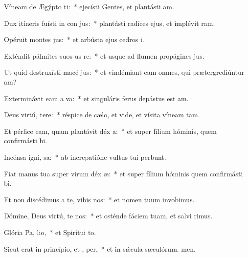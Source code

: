 \item Víneam de Ægýpto ti:~* ejecísti Gentes, et plantásti am.
\item Dux itíneris fuísti in con jus:~* plantásti radíces ejus, et implévit ram.
\item Opéruit montes  jus:~* et arbústa ejus cedros i.
\item Exténdit pálmites suos us  re:~* et usque ad flumen propágines jus.
\item Ut quid destruxísti macé jus:~* et vindémiant eam omnes, qui prætergrediúntur am?
\item Exterminávit eam a  va:~* et singuláris ferus depástus est am.
\item Deus virtú, tere:~* réspice de cælo, et vide, et vísita víneam tam.
\item Et pérfice eam, quam plantávit déx a:~* et super fílium hóminis, quem confirmásti bi.
\item Incénsa igni,  sa:~* ab increpatióne vultus tui perbunt.
\item Fiat manus tua super virum déx æ:~* et super fílium hóminis quem confirmásti bi.
\item Et non discédimus a te, vibis nos:~* et nomen tuum invobimus.
\item Dómine, Deus virtú, te nos:~* et osténde fáciem tuam, et salvi rimus.
\item Glória Pa,  lio,~* et Spirítui to.
\item Sicut erat in princípio, et ,  per,~* et in sǽcula sæculórum. men.
